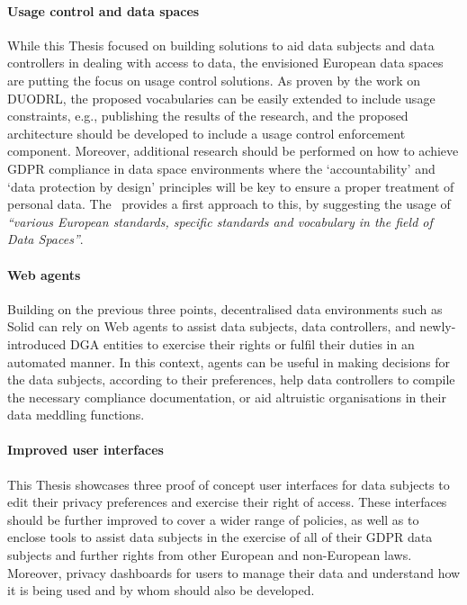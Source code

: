 \paragraph{Usage control and data spaces} While this Thesis focused on building solutions to aid data subjects and data controllers in dealing with access to data, the envisioned European data spaces are putting the focus on usage control solutions. As proven by the work on DUODRL, the proposed vocabularies can be easily extended to include usage constraints, e.g., publishing the results of the research, and the proposed architecture should be developed to include a usage control enforcement component. Moreover, additional research should be performed on how to achieve GDPR compliance in data space environments where the `accountability' and `data protection by design' principles will be key to ensure a proper treatment of personal data. The~\cite{agencia_espanola_de_proteccion_de_datos_approach_2023} provides a first approach to this, by suggesting the usage of \textit{``various European standards, specific standards and vocabulary in the field of Data Spaces''}.

\paragraph{Web agents} Building on the previous three points, decentralised data environments such as Solid can rely on Web agents to assist data subjects, data controllers, and newly-introduced DGA entities to exercise their rights or fulfil their duties in an automated manner. In this context, agents can be useful in making decisions for the data subjects, according to their preferences, help data controllers to compile the necessary compliance documentation, or aid altruistic organisations in their data meddling functions.

\paragraph{Improved user interfaces} This Thesis showcases three proof of concept user interfaces for data subjects to edit their privacy preferences and exercise their right of access. These interfaces should be further improved to cover a wider range of policies, as well as to enclose tools to assist data subjects in the exercise of all of their GDPR data subjects and further rights from other European and non-European laws. Moreover, privacy dashboards for users to manage their data and understand how it is being used and by whom should also be developed.

